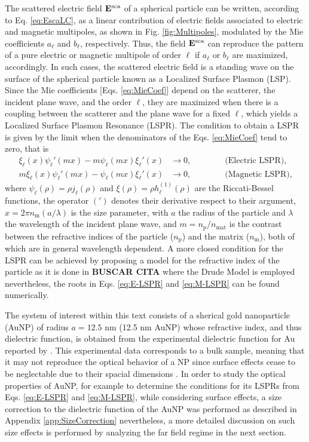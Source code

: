 The scattered electric field $\vb{E}^\text{sca}$ of a spherical particle can be written, according to Eq. \eqref{eq:EscaLC}, as a linear contribution of electric fields associated to electric and magnetic multipoles, as shown in Fig. \ref{fig:Multipoles}, modulated by the Mie coefficients $a_\ell$ and $b_\ell$, respectively. Thus, the field $\vb{E}^\text{sca}$ can reproduce the pattern of a pure  electric or magnetic multipole of order $\ell$ if $a_\ell$ or $b_\ell$ are maximized, accordingly. In such cases, the scattered electric field is a standing wave on the surface of the spherical particle known as a Localized Surface Plasmon (LSP). Since the Mie coefficients [Eqs. \eqref{eq:MieCoef}]  depend on the scatterer, the incident plane wave, and the order $\ell$, they are maximized when there is a coupling between the scatterer and the plane wave for a fixed $\ell$, which yields a Localized Surface Plasmon Resonance (LSPR). The condition to obtain a LSPR is given by the limit when the denominators of the Eqs. \eqref{eq:MieCoef} tend to zero, that is
%
\begin{align}
 	\xi_\ell(x)\psi_\ell'(mx)-m\psi_\ell(mx)\xi_\ell'(x) &\to 0, \qquad\qquad \text{(Electric LSPR),}
 		\label{eq:E-LSPR}\\
 	m\xi_\ell(x)\psi_\ell'(mx)-\psi_\ell(mx)\xi_\ell'(x) &\to 0, \qquad\qquad \text{(Magnetic LSPR),}
 		\label{eq:M-LSPR}
\end{align}
%
where $\psi_\ell( \rho) = \rho j_\ell(\rho)$ and $\xi(\rho) = \rho h_\ell^{(1)}(\rho)$  are the Riccati-Bessel functions, the operator $(')$ denotes their derivative respect to their argument,  $x= 2\pi n_\text{m} (a/\lambda)$ is the size parameter, with $a$ the radius of the particle and $\lambda$ the wavelength of the incident plane wave, and $m =  n_\text{p} / n_\text{mat}$ is the contrast between the refractive indices of the particle ($n_\text{p}$) and the matrix ($n_\text{m}$), both of which are in general wavelength dependent. A more closed condition for the  LSPR can be achieved by proposing a model for the refractive index of the particle as it is done in \textbf{BUSCAR CITA} where the Drude Model is employed nevertheless, the roots in Eqs. \eqref{eq:E-LSPR} and \eqref{eq:M-LSPR} can be found numerically.

The system of interest within this text consists of a sherical gold nanoparticle (AuNP) of  radius $a = 12.5$ nm (12.5 nm AuNP) whose refractive index, and thus dielectric function, is obtained from the experimental dielectric function for Au reported by \citeauthor{johnson_optical_1972} \cite{johnson_optical_1972}.  This experimental data corresponds to a bulk sample, meaning that it may not reproduce the optical behavior of a NP since surface effects cease to be neglectable  due to their spacial dimensions \cite{noguez_surface_2007}. In order to study  the optical properties of AuNP, for example to determine the conditions for its LSPRs from   Eqs. \eqref{eq:E-LSPR}  and \eqref{eq:M-LSPR}, while considering  surface effects,  a size correction to the dielectric function of the AuNP was performed as described in Appendix \ref{app:SizeCorrection} nevertheless, a more detailed discussion on such size effects is performed by analyzing the far field regime in the next section.


